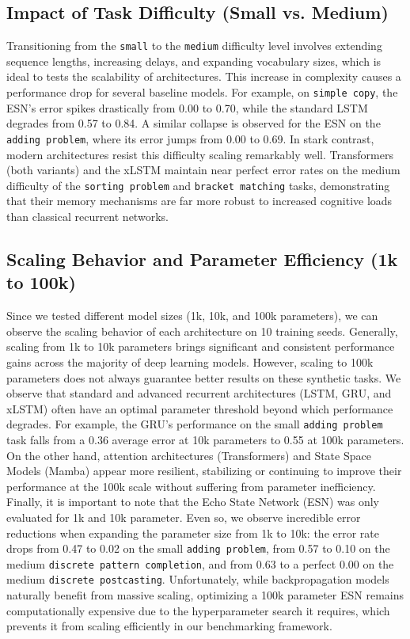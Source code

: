 \documentclass{article}
\begin{document}
\subsection{Impact of Task Difficulty (Small vs. Medium)}

Transitioning from the \texttt{small} to the \texttt{medium} difficulty level involves extending sequence lengths, increasing delays, and expanding vocabulary sizes, which is ideal to tests the scalability of architectures. This increase in complexity causes a performance drop for several baseline models. For example, on \texttt{simple copy}, the ESN's error spikes drastically from 0.00  to 0.70, while the standard LSTM degrades from 0.57 to 0.84. A similar collapse is observed for the ESN on the \texttt{adding problem}, where its error jumps from 0.00 to 0.69. In stark contrast, modern architectures resist this difficulty scaling remarkably well. Transformers (both variants) and the xLSTM maintain near perfect error rates on the medium difficulty of the \texttt{sorting problem} and \texttt{bracket matching} tasks, demonstrating that their memory mechanisms are far more robust to increased cognitive loads than classical recurrent networks.

\subsection{Scaling Behavior and Parameter Efficiency (1k to 100k)}

Since we tested different model sizes (1k, 10k, and 100k parameters), we can observe the scaling behavior of each architecture on 10 training seeds. Generally, scaling from 1k to 10k parameters brings significant and consistent performance gains across the majority of deep learning models. However, scaling to 100k parameters does not always guarantee better results on these synthetic tasks. We observe that standard and advanced recurrent architectures (LSTM, GRU, and xLSTM) often have an optimal parameter threshold beyond which performance degrades. For example, the GRU's performance on the small \texttt{adding problem} task falls from a 0.36 average error at 10k parameters to 0.55 at 100k parameters. On the other hand, attention architectures (Transformers) and State Space Models (Mamba) appear more resilient, stabilizing or continuing to improve their performance at the 100k scale without suffering from parameter inefficiency. Finally, it is important to note that the Echo State Network (ESN) was only evaluated for 1k and 10k parameter. Even so, we observe incredible error reductions when expanding the parameter size from 1k to 10k: the error rate drops from 0.47 to 0.02 on the small \texttt{adding problem}, from 0.57 to 0.10 on the medium \texttt{discrete pattern completion}, and from 0.63 to a perfect 0.00 on the medium \texttt{discrete postcasting}. Unfortunately, while backpropagation models naturally benefit from massive scaling, optimizing a 100k parameter ESN remains computationally expensive due to the hyperparameter search it requires, which prevents it from scaling efficiently in our benchmarking framework.
\end{document}
